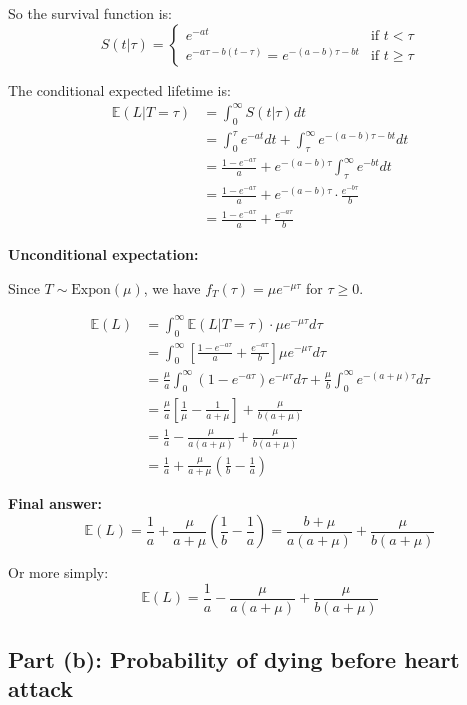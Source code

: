 \documentclass[11pt]{article}
\begin{document}
So the survival function is:
$$S(t|\tau) = \begin{cases}
    e^{-at} & \text{if } t < \tau \\
    e^{-a\tau - b(t-\tau)} = e^{-(a-b)\tau - bt} & \text{if } t \geq \tau
\end{cases}$$

The conditional expected lifetime is:
\begin{align*}
\mathbb{E}(L|T=\tau) &= \int_0^\infty S(t|\tau) dt \\
&= \int_0^\tau e^{-at} dt + \int_\tau^\infty e^{-(a-b)\tau - bt} dt \\
&= \frac{1-e^{-a\tau}}{a} + e^{-(a-b)\tau} \int_\tau^\infty e^{-bt} dt \\
&= \frac{1-e^{-a\tau}}{a} + e^{-(a-b)\tau} \cdot \frac{e^{-b\tau}}{b} \\
&= \frac{1-e^{-a\tau}}{a} + \frac{e^{-a\tau}}{b}
\end{align*}

\textbf{Unconditional expectation:}

Since $T \sim \text{Expon}(\mu)$, we have $f_T(\tau) = \mu e^{-\mu \tau}$ for $\tau \geq 0$.

\begin{align*}
\mathbb{E}(L) &= \int_0^\infty \mathbb{E}(L|T=\tau) \cdot \mu e^{-\mu\tau} d\tau \\
&= \int_0^\infty \left[\frac{1-e^{-a\tau}}{a} + \frac{e^{-a\tau}}{b}\right] \mu e^{-\mu\tau} d\tau \\
&= \frac{\mu}{a}\int_0^\infty (1-e^{-a\tau})e^{-\mu\tau} d\tau + \frac{\mu}{b}\int_0^\infty e^{-(a+\mu)\tau} d\tau \\
&= \frac{\mu}{a}\left[\frac{1}{\mu} - \frac{1}{a+\mu}\right] + \frac{\mu}{b(a+\mu)} \\
&= \frac{1}{a} - \frac{\mu}{a(a+\mu)} + \frac{\mu}{b(a+\mu)} \\
&= \frac{1}{a} + \frac{\mu}{a+\mu}\left(\frac{1}{b} - \frac{1}{a}\right)
\end{align*}

\textbf{Final answer:}
$$\boxed{\mathbb{E}(L) = \frac{1}{a} + \frac{\mu}{a+\mu}\left(\frac{1}{b} - \frac{1}{a}\right) = \frac{b + \mu}{a(a+\mu)} + \frac{\mu}{b(a+\mu)}}$$

Or more simply:
$$\boxed{\mathbb{E}(L) = \frac{1}{a} - \frac{\mu}{a(a+\mu)} + \frac{\mu}{b(a+\mu)}}$$

\subsection*{Part (b): Probability of dying before heart attack}
\end{document}
